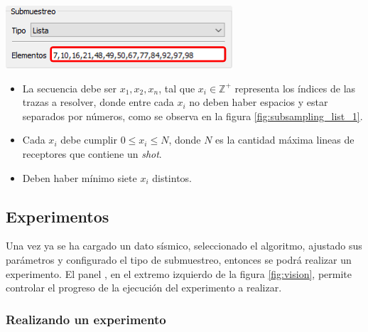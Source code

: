\documentclass[12pt,twoside,letter]{ol-softwaremanual}
\newcommand*\circled[1]{\tikz[baseline=(char.base)]{
            \node[shape=circle,draw,inner sep=2pt] (char) {#1};}}
\newenvironment{Figure}
  {\par\medskip\noindent\minipage{\linewidth}}
  {\endminipage\par\medskip}
\begin{document}
\begin{multicols}{2}

\begin{Figure}
	\vspace{5mm}
	\centering
	\includegraphics[width=1\linewidth]{subsampling-list-1.png}
	\label{fig:subsampling_list_1}
\end{Figure}

\begin{itemize}
	\setlength\itemsep{0em}
    \item La secuencia debe ser $x_1,x_2,x_n$, tal que $x_i \in \mathbb{Z}^+$ representa los índices de las trazas a resolver, donde entre cada $x_i$ no deben haber espacios y estar separados por números, como se observa en la figura \ref{fig:subsampling_list_1}.
    \item Cada $x_i$ debe cumplir $0 \leq x_i \leq N$, donde $N$ es la cantidad máxima lineas de receptores que contiene un \emph{shot}.
    \item Deben haber mínimo siete $x_i$ distintos.
\end{itemize}

\end{multicols}

\subsection{Experimentos}
\label{sec:experiment}

Una vez ya se ha cargado un dato sísmico, seleccionado el algoritmo, ajustado sus parámetros y configurado el tipo de submuestreo, entonces se podrá realizar un experimento. El panel \circled{5}, en el extremo izquierdo de la figura \ref{fig:vision}, permite controlar el progreso de la ejecución del experimento a realizar.

\subsubsection{Realizando un experimento}
\end{document}
